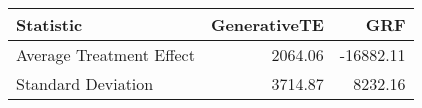 \begin{tabular}{lrr}
\toprule
Statistic & GenerativeTE & GRF \\
\midrule
Average Treatment Effect & 2064.06 & -16882.11 \\
Standard Deviation & 3714.87 & 8232.16 \\
\bottomrule
\end{tabular}

